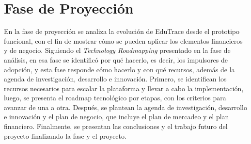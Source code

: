 \documentclass[letterpaper, 10 pt, conference]{ieeeconf}
\begin{document}
\section{Fase de Proyección}
En la fase de proyección se analiza la evolución de EduTrace desde el prototipo funcional, con el fin de mostrar cómo se pueden aplicar los elementos financieros y de negocio.
Siguiendo el \textit{Technology Roadmapping} \cite{27} presentado en la fase de análisis, en esa fase se identificó por qué hacerlo, es decir, los impulsores de adopción, y esta fase responde cómo hacerlo y con qué recursos, además de la agenda de investigación, desarrollo e innovación.
Primero, se identifican los recursos necesarios para escalar la plataforma y llevar a cabo la implementación, luego, se presenta el roadmap tecnológico por etapas, con los criterios para avanzar de una a otra.
Después, se plantean la agenda de investigación, desarrollo e innovación y el plan de negocio, que incluye el plan de mercadeo y el plan financiero.
Finalmente, se presentan las conclusiones y el trabajo futuro del proyecto finalizando la fase y el proyecto.
\end{document}
